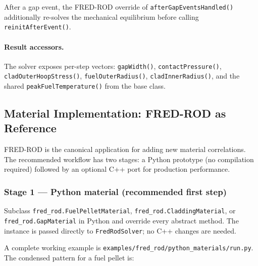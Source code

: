 \documentclass[11pt,a4paper]{article}
\begin{document}
After a gap event, the FRED-ROD override of \texttt{afterGapEventsHandled()} additionally re-solves the mechanical equilibrium before calling \texttt{reinitAfterEvent()}.

\paragraph{Result accessors.}
The solver exposes per-step vectors: \texttt{gapWidth()}, \texttt{contactPressure()}, \texttt{cladOuterHoopStress()}, \texttt{fuelOuterRadius()}, \texttt{cladInnerRadius()}, and the shared \texttt{peakFuelTemperature()} from the base class.

\subsection{Material Implementation: FRED-ROD as Reference}
\label{sec:fred_rod_materials}

FRED-ROD is the canonical application for adding new material correlations. The recommended workflow has two stages: a Python prototype (no compilation required) followed by an optional C++ port for production performance.

\subsubsection{Stage 1 --- Python material (recommended first step)}

Subclass \texttt{fred\_rod.FuelPelletMaterial}, \texttt{fred\_rod.CladdingMaterial}, or \texttt{fred\_rod.GapMaterial} in Python and override every abstract method. The instance is passed directly to \texttt{FredRodSolver}; no C++ changes are needed.

A complete working example is \texttt{examples/fred\_rod/python\_materials/run.py}. The condensed pattern for a fuel pellet is:
\end{document}
